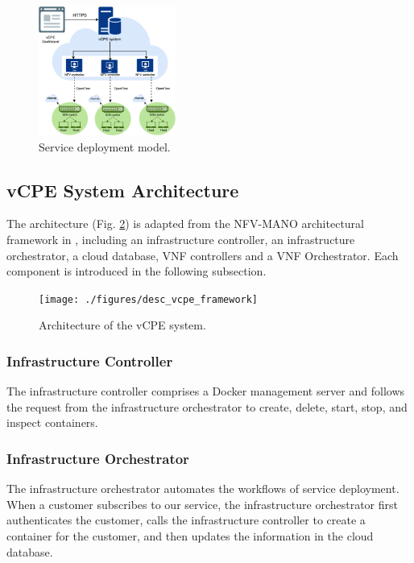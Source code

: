 \documentclass[conference]{IEEEtran}
\begin{document}
\begin{figure}[!t]
\centering
\includegraphics[width=0.4\textwidth]{./figures/desc_service_deployment}
\caption{Service deployment model.}
\label{fig:desc_service_deployment}
\end{figure}



\subsection{vCPE System Architecture}
The architecture (Fig. \ref{fig:desc_vcpe_framework}) is adapted from the NFV-MANO architectural framework in \cite{etsi-nfv-mano}, including an infrastructure controller, an infrastructure orchestrator, a cloud database, VNF controllers and a VNF Orchestrator. Each component is introduced in the following subsection.

\begin{figure}[!t]
\centering
\texttt{[image: ./figures/desc\_vcpe\_framework]}
\caption{Architecture of the vCPE system.}
\label{fig:desc_vcpe_framework}
\end{figure}

\subsubsection{Infrastructure Controller}

The infrastructure controller comprises a Docker management server and follows the request from the infrastructure orchestrator to create, delete, start, stop, and inspect containers.

\subsubsection{Infrastructure Orchestrator}

The infrastructure orchestrator automates the workflows of service deployment. When a customer subscribes to our service, the infrastructure orchestrator first authenticates the customer, calls the infrastructure controller to create a container for the customer, and then updates the information in the cloud database.
\end{document}
